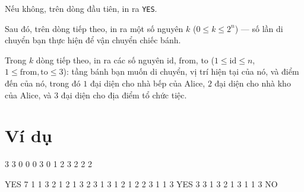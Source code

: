 \documentclass[11pt]{article}
\newcommand{\exmp}[2]{
    \begin{inputbox}#1\end{inputbox}
    \begin{outputbox}#2\end{outputbox}
}
\begin{document}
Nếu không, trên dòng đầu tiên, in ra \texttt{YES}.

Sau đó, trên dòng tiếp theo, in ra một số nguyên $k$ ($0 \le k \le 2^n$) — số lần di chuyển bạn thực hiện để vận chuyển chiếc bánh.

Trong $k$ dòng tiếp theo, in ra các số nguyên $\mathrm{id}$, $\mathrm{from}$, $\mathrm{to}$ ($1 \le \mathrm{id} \le n$, $1 \le \mathrm{from}, \mathrm{to} \le 3$): tầng bánh bạn muốn di chuyển, vị trí hiện tại của nó, và điểm đến của nó, trong đó $1$ đại diện cho nhà bếp của Alice, $2$ đại diện cho nhà kho của Alice, và $3$ đại diện cho địa điểm tổ chức tiệc.

\section*{Ví dụ}

\exmp{
3
3
0 0 0
3
0 1 2
3
2 2 2
}{
YES
7
1 1 3
2 1 2
1 3 2
3 1 3
1 2 1
2 2 3
1 1 3
YES
3
3 1 3
2 1 3
1 1 3
NO
}%
\end{document}
